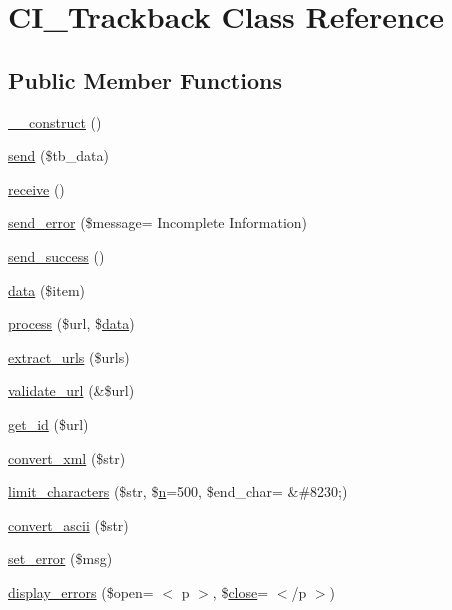 \hypertarget{class_c_i___trackback}{}\section{C\+I\+\_\+\+Trackback Class Reference}
\label{class_c_i___trackback}
\subsection*{Public Member Functions}
\begin{DoxyCompactItemize}
\item 
\hyperlink{class_c_i___trackback_a095c5d389db211932136b53f25f39685}{\+\_\+\+\_\+construct} ()
\item 
\hyperlink{class_c_i___trackback_a4ee54341ef16e67ca033704f4373a56b}{send} (\$tb\+\_\+data)
\item 
\hyperlink{class_c_i___trackback_ac805eb3a4eb25b19c1ab093023da4d35}{receive} ()
\item 
\hyperlink{class_c_i___trackback_a277bbe0de9722c8222b90c275f1a2e50}{send\+\_\+error} (\$message= \textquotesingle{}Incomplete Information\textquotesingle{})
\item 
\hyperlink{class_c_i___trackback_a57468453a4dc88340fdf12fb6e314248}{send\+\_\+success} ()
\item 
\hyperlink{class_c_i___trackback_a4d04a7a984a4bcc71e27be87706f393c}{data} (\$item)
\item 
\hyperlink{class_c_i___trackback_a7244ffd64e186d863812bb300fec8cdc}{process} (\$url, \$\hyperlink{class_c_i___trackback_a4d04a7a984a4bcc71e27be87706f393c}{data})
\item 
\hyperlink{class_c_i___trackback_aab29f333201544b83e318dd761ac797a}{extract\+\_\+urls} (\$urls)
\item 
\hyperlink{class_c_i___trackback_a5caa264fab6d2b2344e6bd5b298b08f2}{validate\+\_\+url} (\&\$url)
\item 
\hyperlink{class_c_i___trackback_a404e345e61e00d5685117a101b5bc71a}{get\+\_\+id} (\$url)
\item 
\hyperlink{class_c_i___trackback_a1ec67af2037561b65ffe49b59727cb53}{convert\+\_\+xml} (\$str)
\item 
\hyperlink{class_c_i___trackback_ae0ad829d77163bde82745af94068a6b7}{limit\+\_\+characters} (\$str, \$\hyperlink{cli_2error__general_8php_ace0fd03cd383f20ce6ea63247a207294}{n}=500, \$end\+\_\+char= \textquotesingle{}\&\#8230;\textquotesingle{})
\item 
\hyperlink{class_c_i___trackback_a0029bda7d34a222a5bda4ac894c31ac1}{convert\+\_\+ascii} (\$str)
\item 
\hyperlink{class_c_i___trackback_a892f1ba7cba3731a3fc68f1f64e92610}{set\+\_\+error} (\$msg)
\item 
\hyperlink{class_c_i___trackback_a3ed4aa1a4d480c82bb1b663efd466aee}{display\+\_\+errors} (\$open= \textquotesingle{}$<$ p $>$\textquotesingle{}, \$\hyperlink{bootstrap_8min_8js_afaca3a961d693f40135a872e93e71198}{close}= \textquotesingle{}$<$/p $>$\textquotesingle{})
\end{DoxyCompactItemize}
